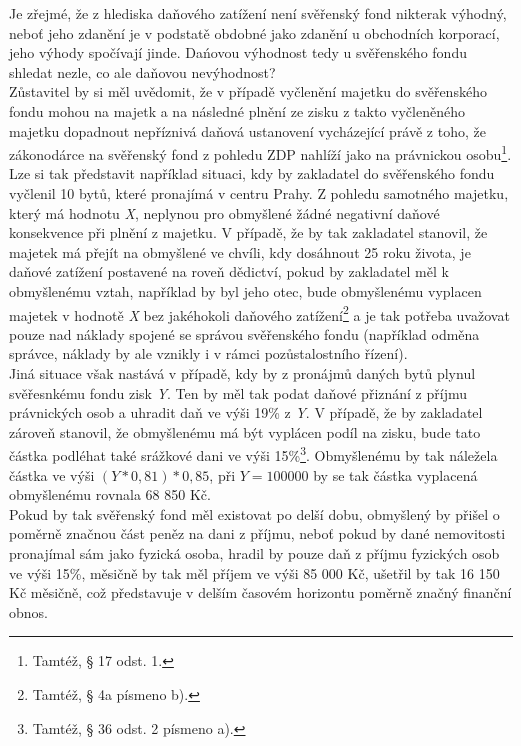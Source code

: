\documentclass{article}
\begin{document}
Je zřejmé, že z hlediska daňového zatížení není svěřenský fond nikterak výhodný, neboť jeho zdanění je v podstatě obdobné jako zdanění u obchodních korporací, jeho výhody spočívají jinde. Dańovou výhodnost tedy u svěřenského fondu shledat nezle, co ale daňovou nevýhodnost?\\

Zůstavitel by si měl uvědomit, že v případě vyčlenění majetku do svěřenského fondu mohou na majetk a na následné plnění ze zisku z takto vyčleněného majetku dopadnout nepříznivá daňová ustanovení vycházející právě z toho, že zákonodárce na svěřenský fond z pohledu ZDP nahlíží jako na právnickou osobu\footnote{Tamtéž, § 17 odst. 1.}.\\

Lze si tak představit například situaci, kdy by zakladatel do svěřenského fondu vyčlenil 10 bytů, které pronajímá v centru Prahy. Z pohledu samotného majetku, který má hodnotu \textit{X}, neplynou pro obmyšlené žádné negativní daňové konsekvence při plnění z majetku. V případě, že by tak zakladatel stanovil, že majetek má přejít na obmyšlené ve chvíli, kdy dosáhnout 25 roku života, je daňové zatížení postavené na roveň dědictví, pokud by zakladatel měl k obmyšlenému vztah, například by byl jeho otec, bude obmyšlenému vyplacen majetek v hodnotě \textit{X} bez jakéhokoli daňového zatížení\footnote{Tamtéž, § 4a písmeno b).} a je tak potřeba uvažovat pouze nad náklady spojené se správou svěřenského fondu (například odměna správce, náklady by ale vznikly i v rámci pozůstalostního řízení).\\

Jiná situace však nastává v případě, kdy by z pronájmů daných bytů plynul svěřesnkému fondu zisk \textit{Y}. Ten by měl tak podat daňové přiznání z příjmu právnických osob a uhradit daň ve výši 19\% z \textit{Y}. V případě, že by zakladatel zároveň stanovil, že obmyšlenému má být vyplácen podíl na zisku, bude tato částka podléhat také srážkové dani ve výši 15\%\footnote{Tamtéž, § 36 odst. 2 písmeno a).}. Obmyšlenému by tak náležela částka ve výši $(Y * 0,81) * 0,85$, při $Y = 100000$ by se tak částka vyplacená obmyšlenému rovnala 68 850 Kč.\\

Pokud by tak svěřenský fond měl existovat po delší dobu, obmyšlený by přišel o poměrně značnou část peněz na dani z příjmu, neboť pokud by dané nemovitosti pronajímal sám jako fyzická osoba, hradil by pouze daň z příjmu fyzických osob ve výši 15\%, měsičně by tak měl příjem ve výši 85 000 Kč, ušetřil by tak 16 150 Kč měsičně, což představuje v delším časovém horizontu poměrně značný finanční obnos.\\
\end{document}
